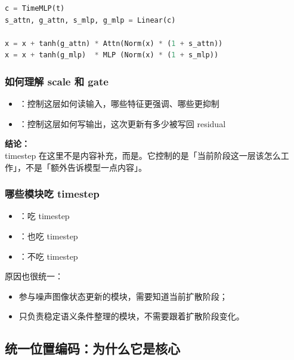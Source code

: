 \begin{lstlisting}[language=Python]
c = TimeMLP(t)
s_attn, g_attn, s_mlp, g_mlp = Linear(c)

x = x + tanh(g_attn) * Attn(Norm(x) * (1 + s_attn))
x = x + tanh(g_mlp)  * MLP (Norm(x) * (1 + s_mlp))
\end{lstlisting}

\subsubsection{如何理解 scale 和 gate}

\begin{itemize}[leftmargin=1.5em]
  \item {}：控制这层如何读输入，哪些特征更强调、哪些更抑制
  \item {}：控制这层如何写输出，这次更新有多少被写回 residual
\end{itemize}

\begin{summarybox}
\textbf{结论：}\\
timestep 在这里不是内容补充，而是。它控制的是「当前阶段这一层该怎么工作」，不是「额外告诉模型一点内容」。
\end{summarybox}

\subsubsection{哪些模块吃 timestep}

\begin{itemize}[leftmargin=1.5em]
  \item {}：吃 timestep
  \item {}：也吃 timestep
  \item {}：不吃 timestep
\end{itemize}

原因也很统一：

\begin{itemize}[leftmargin=1.5em]
  \item 参与噪声图像状态更新的模块，需要知道当前扩散阶段；
  \item 只负责稳定语义条件整理的模块，不需要跟着扩散阶段变化。
\end{itemize}

\subsection{统一位置编码：为什么它是核心}

